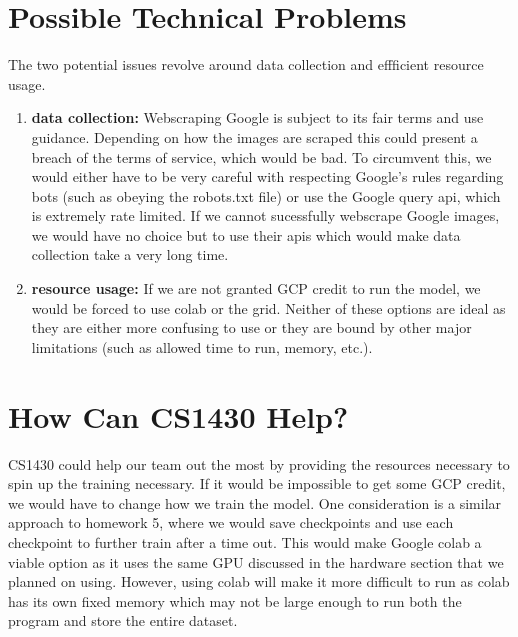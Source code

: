 \section*{Possible Technical Problems}
The two potential issues revolve around data collection and effficient resource usage.
\begin{enumerate}
  \item \textbf{data collection:} Webscraping Google is subject to its fair terms and use guidance. Depending on how the images are scraped this could present a breach of the terms of 
  service, which would be bad. To circumvent this, we would either have to be very careful with respecting Google's rules regarding bots (such as obeying the robots.txt file) or use the Google query api, which is 
  extremely rate limited. If we cannot sucessfully webscrape Google images, we would have no choice but to use their apis which would make data collection take a very long time.
  \item \textbf{resource usage:} If we are not granted GCP credit to run the model, we would be forced to use colab or the grid. Neither of these options are ideal as they are either more confusing to use or they are 
  bound by other major limitations (such as allowed time to run, memory, etc.).
\end{enumerate}
\section*{How Can CS1430 Help?}
CS1430 could help our team out the most by providing the resources necessary to spin up the training necessary. If it would be impossible to get some GCP credit, we would have to change how we 
train the model. One consideration is a similar approach to homework 5, where we would save checkpoints and use each checkpoint to further train after a time out. This would make Google colab a viable 
option as it uses the same GPU discussed in the hardware section that we planned on using. However, using colab will make it more difficult to run as colab has its own fixed memory which may not be large 
enough to run both the program and store the entire dataset.

